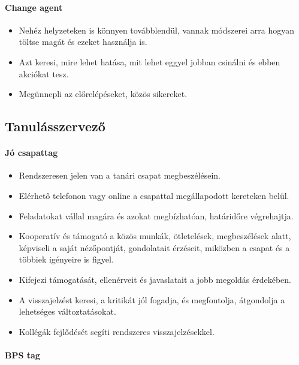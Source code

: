 \paragraph{Change agent}\label{change-agent}

\begin{itemize}

\item
  Nehéz helyzeteken is könnyen továbblendül, vannak módszerei arra
  hogyan töltse magát és ezeket használja is.
\item
  Azt keresi, mire lehet hatása, mit lehet eggyel jobban csinálni és
  ebben akciókat tesz.
\item
  Megünnepli az előrelépéseket, közös sikereket.
\end{itemize}

\subsection{Tanulásszervező}\label{tanuluxe1sszervezux151}

\paragraph{Jó csapattag}\label{juxf3-csapattag}

\begin{itemize}

\item
  Rendszeresen jelen van a tanári csapat megbeszélésein.
\item
  Elérhető telefonon vagy online a csapattal megállapodott kereteken
  belül.
\item
  Feladatokat vállal magára és azokat megbízhatóan, határidőre
  végrehajtja.
\item
  Kooperatív és támogató a közös munkák, ötletelések, megbeszélések
  alatt, képviseli a saját nézőpontját, gondolatait érzéseit, miközben a
  csapat és a többiek igényeire is figyel.
\item
  Kifejezi támogatását, ellenérveit és javaslatait a jobb megoldás
  érdekében.
\item
  A visszajelzést keresi, a kritikát jól fogadja, és megfontolja,
  átgondolja a lehetséges változtatásokat.
\item
  Kollégák fejlődését segíti rendszeres visszajelzésekkel.
\end{itemize}

\paragraph{BPS tag}\label{bps-tag}

